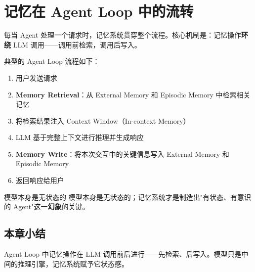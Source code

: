 \section{记忆在 Agent Loop 中的流转}

每当 Agent 处理一个请求时，记忆系统贯穿整个流程。核心机制是：记忆操作\textbf{环绕} LLM 调用——调用前检索，调用后写入。

典型的 Agent Loop 流程如下：

\begin{enumerate}[leftmargin=2em]
    \item 用户发送请求
    \item \textbf{Memory Retrieval}：从 External Memory 和 Episodic Memory 中检索相关记忆
    \item 将检索结果注入 Context Window（In-context Memory）
    \item LLM 基于完整上下文进行推理并生成响应
    \item \textbf{Memory Write}：将本次交互中的关键信息写入 External Memory 和 Episodic Memory
    \item 返回响应给用户
\end{enumerate}

\begin{importantbox}{模型本身是无状态的}
模型本身是无状态的；记忆系统才是制造出"有状态、有意识的 Agent"这一\textbf{幻象}的关键。
\end{importantbox}

\subsection{本章小结}

Agent Loop 中记忆操作在 LLM 调用前后进行——先检索、后写入。模型只是中间的推理引擎，记忆系统赋予它状态感。

